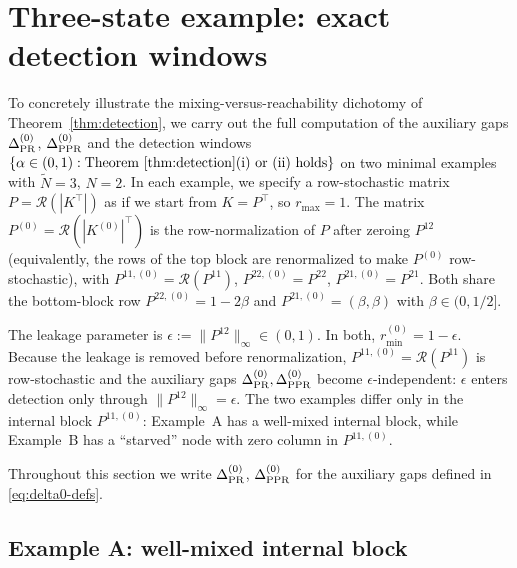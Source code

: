 \documentclass{article}
\theoremstyle{plain}
\theoremstyle{definition}
\def\tp{\intercal}
\newcommand{\arXivtag}[1][]{#1}
\begin{document}
\section{Three-state example: exact detection windows}\label{app:3state}

To concretely illustrate the mixing-versus-reachability dichotomy of Theorem~\ref{thm:detection}, we carry out the full computation of the auxiliary gaps $\Delta^{(0)}_{\textnormal{PR}}$, $\Delta^{(0)}_{\textnormal{PPR}}$ and the detection windows $\{\alpha \in (0,1) : \text{Theorem~\ref{thm:detection}(i) or (ii) holds}\}$ on two minimal examples with $\tilde{N} = 3$, $N = 2$. In each example, we specify a row-stochastic matrix $P=\mathcal{R}(|K^\tp|)$ as if we start from $K = P^\tp$, so $r_{\max} = 1$. The matrix $P^{(0)} = \mathcal{R}(|K^{(0)}|^\tp)$ is the row-normalization of $P$ after zeroing $P^{12}$ (equivalently, \arXivtag[the rows of the top block] are renormalized to make $P^{(0)}$ row-stochastic), with $P^{11,(0)} = \mathcal{R}(P^{11})$, $P^{22,(0)} = P^{22}$, $P^{21,(0)} = P^{21}$. Both share the \arXivtag[bottom-block] row $P^{22,(0)} = 1-2\beta$ and $P^{21,(0)} = (\beta, \beta)$ with $\beta \in (0, 1/2]$. 

The leakage parameter is $\epsilon := \|P^{12}\|_\infty \in (0, 1)$. In both, $r^{(0)}_{\min} = 1-\epsilon$. Because the leakage is removed before renormalization, $P^{11,(0)} = \mathcal{R}(P^{11})$ is row-stochastic and the auxiliary gaps $\Delta^{(0)}_{\textnormal{PR}}, \Delta^{(0)}_{\textnormal{PPR}}$ become $\epsilon$-independent: $\epsilon$ enters detection only through $\|P^{12}\|_\infty = \epsilon$. The two examples differ only in the internal block $P^{11,(0)}$: Example~A has a well-mixed internal block, while Example~B has a ``starved'' node with zero column in $P^{11,(0)}$.

Throughout this section we write $\Delta^{(0)}_{\textnormal{PR}}$, $\Delta^{(0)}_{\textnormal{PPR}}$ for the auxiliary gaps defined in \eqref{eq:delta0-defs}.

\subsection{Example A: well-mixed internal block}\label{app:2state-mixing}
\end{document}
